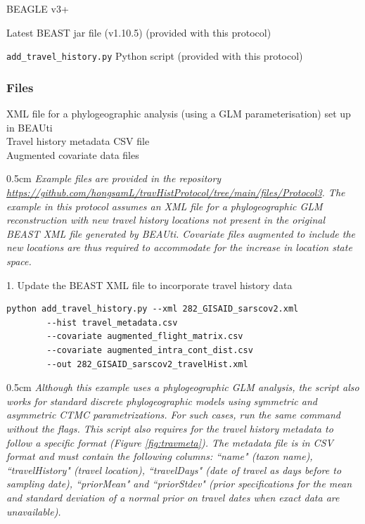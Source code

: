 \documentclass{article}
\newcommand{\ann}[1]{
\begin{adjustwidth}{0.5cm}{}
\it{#1}\\
\end{adjustwidth}}
\newcommand{\code}[1]{
{\upshape\ttfamily{#1}}}
\begin{document}
\hspace{0.5cm}BEAGLE v3+

\hspace{0.5cm}Latest BEAST jar file (v1.10.5) (provided with this protocol)

\hspace{0.5cm}\verb|add_travel_history.py| Python script (provided with this protocol)

\subsubsection*{Files}
XML file for a phylogeographic analysis (using a GLM  parameterisation) set up in BEAUti \\
Travel history metadata CSV file \\
Augmented covariate data files \\

\ann{Example files are provided in the repository\\
{\upshape\url{https://github.com/hongsamL/travHistProtocol/tree/main/files/Protocol3}}.
The example in this protocol assumes an XML file for a phylogeographic GLM reconstruction with new travel history locations not present in the original BEAST XML file generated by BEAUti.
Covariate files augmented to include the new locations are thus required to accommodate for the increase in location state space.}

1. Update the BEAST XML file to incorporate travel history data
\begin{verbatim}
python add_travel_history.py --xml 282_GISAID_sarscov2.xml
        --hist travel_metadata.csv
        --covariate augmented_flight_matrix.csv
        --covariate augmented_intra_cont_dist.csv
        --out 282_GISAID_sarscov2_travelHist.xml
\end{verbatim}

\ann{Although this example uses a phylogeographic GLM analysis, the\code{add\_travel\_history.py} script also works for standard discrete phylogeographic models using symmetric and asymmetric CTMC parametrizations. For such cases, run the same command without the\code{--covariate} flags. This script also requires for the travel history metadata to follow a specific format (Figure \ref{fig:travmeta}).
The metadata file is in CSV format and must contain the following columns: ``name"  (taxon name), ``travelHistory"  (travel location), ``travelDays"  (date of travel as days before to sampling date), ``priorMean"  and ``priorStdev"
(prior specifications for the mean and standard deviation of a normal prior on travel dates when exact data are unavailable).}
\end{document}
